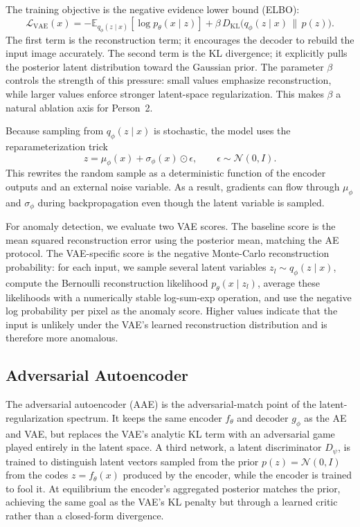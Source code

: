 \documentclass[11pt]{article}
\begin{document}
The training objective is the negative evidence lower bound (ELBO):
\begin{equation}
\mathcal{L}_{\text{VAE}}(x)=
-\mathbb{E}_{q_{\phi}(z\mid x)}[\log p_{\theta}(x\mid z)]
+\beta\,D_{\mathrm{KL}}\big(q_{\phi}(z\mid x)\,\|\,p(z)\big).
\end{equation}
The first term is the reconstruction term; it encourages the decoder to rebuild
the input image accurately. The second term is the KL divergence; it explicitly
pulls the posterior latent distribution toward the Gaussian prior. The parameter
$\beta$ controls the strength of this pressure: small values emphasize
reconstruction, while larger values enforce stronger latent-space
regularization. This makes $\beta$ a natural ablation axis for Person~2.

Because sampling from $q_{\phi}(z\mid x)$ is stochastic, the model uses the
reparameterization trick
\begin{equation}
z = \mu_{\phi}(x) + \sigma_{\phi}(x)\odot\epsilon,\qquad
\epsilon\sim\mathcal{N}(0,I).
\end{equation}
This rewrites the random sample as a deterministic function of the encoder
outputs and an external noise variable. As a result, gradients can flow through
$\mu_{\phi}$ and $\sigma_{\phi}$ during backpropagation even though the latent
variable is sampled.

For anomaly detection, we evaluate two VAE scores. The baseline score is the
mean squared reconstruction error using the posterior mean, matching the AE
protocol. The VAE-specific score is the negative Monte-Carlo reconstruction
probability: for each input, we sample several latent variables
$z_l\sim q_{\phi}(z\mid x)$, compute the Bernoulli reconstruction likelihood
$p_{\theta}(x\mid z_l)$, average these likelihoods with a numerically stable
log-sum-exp operation, and use the negative log probability per pixel as the
anomaly score. Higher values indicate that the input is unlikely under the
VAE's learned reconstruction distribution and is therefore more anomalous.

\subsection{Adversarial Autoencoder}   %
The adversarial autoencoder (AAE) is the adversarial-match point of the
latent-regularization spectrum. It keeps the same encoder $f_\theta$ and decoder
$g_\phi$ as the AE and VAE, but replaces the VAE's analytic KL term with an
adversarial game played entirely in the latent space. A third network, a latent
discriminator $D_\psi$, is trained to distinguish latent vectors sampled from the
prior $p(z)=\mathcal{N}(0,I)$ from the codes $z=f_\theta(x)$ produced by the
encoder, while the encoder is trained to fool it. At equilibrium the encoder's
aggregated posterior matches the prior, achieving the same goal as the VAE's KL
penalty but through a learned critic rather than a closed-form divergence.
\end{document}
